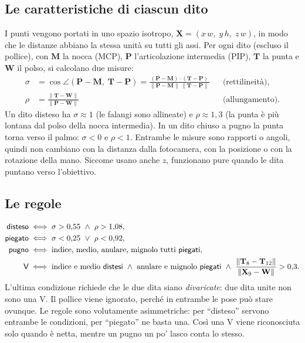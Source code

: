 \documentclass[11pt,a4paper]{article}
\newcommand{\vect}[1]{\mathbf{#1}}
\begin{document}
\subsection{Le caratteristiche di ciascun dito}
I punti vengono portati in uno spazio isotropo, $\vect{X}=(x\,w,\;y\,h,\;z\,w)$, in modo che le
distanze abbiano la stessa unità su tutti gli assi. Per ogni dito (escluso il pollice), con
$\vect{M}$ la nocca (MCP), $\vect{P}$ l'articolazione intermedia (PIP), $\vect{T}$ la punta e
$\vect{W}$ il polso, si calcolano due misure:
\begin{align}
  \sigma &= \cos\angle(\vect{P}-\vect{M},\;\vect{T}-\vect{P})
         =\frac{(\vect{P}-\vect{M})\cdot(\vect{T}-\vect{P})}{\|\vect{P}-\vect{M}\|\,\|\vect{T}-\vect{P}\|}
         &&\text{(rettilineità)},\\
  \rho &= \frac{\|\vect{T}-\vect{W}\|}{\|\vect{P}-\vect{W}\|} &&\text{(allungamento)}.
\end{align}
Un dito disteso ha $\sigma\approx1$ (le falangi sono allineate) e $\rho\approx1{,}3$ (la punta è
più lontana dal polso della nocca intermedia). In un dito chiuso a pugno la punta torna verso il
palmo: $\sigma<0$ e $\rho<1$. Entrambe le misure sono rapporti o angoli, quindi non cambiano con
la distanza dalla fotocamera, con la posizione o con la rotazione della mano. Siccome usano anche
$z$, funzionano pure quando le dita puntano verso l'obiettivo.

\subsection{Le regole}
\begin{align*}
  \textsf{disteso}   &\iff \sigma>0{,}55\ \wedge\ \rho>1{,}08,\\
  \textsf{piegato}   &\iff \sigma<0{,}25\ \vee\ \rho<0{,}92,\\
  \textsf{pugno}     &\iff \text{indice, medio, anulare, mignolo tutti \textsf{piegati}},\\
  \textsf{V}         &\iff \text{indice e medio \textsf{distesi}}\ \wedge\ \text{anulare e mignolo \textsf{piegati}}
                        \ \wedge\ \frac{\|\vect{T}_8-\vect{T}_{12}\|}{\|\vect{X}_9-\vect{W}\|}>0{,}3.
\end{align*}
L'ultima condizione richiede che le due dita siano \emph{divaricate}: due dita unite non sono una
V. Il pollice viene ignorato, perché in entrambe le pose può stare ovunque. Le regole sono
volutamente asimmetriche: per ``disteso'' servono entrambe le condizioni, per ``piegato'' ne basta
una. Così una V viene riconosciuta solo quando è netta, mentre un pugno un po' lasco conta lo
stesso.
\end{document}
